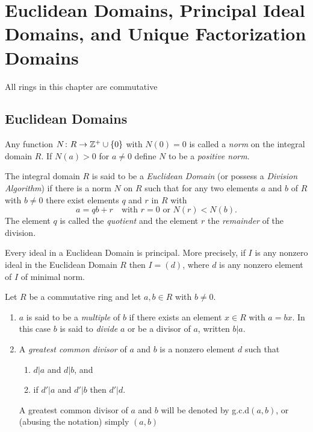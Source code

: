 \documentclass[../main]{subfiles}
\begin{document}
 
\section{Euclidean Domains, Principal Ideal Domains, and Unique Factorization Domains}


All rings in this chapter are commutative

\subsection{Euclidean Domains}


\begin{dfn}
 Any function $N \colon R \to \mathbb{Z}^+ \cup \{0\}$ with $N(0) = 0$ is called a \textit{norm} on the integral domain $R$. If $N(a) > 0$ for $a\neq 0$ define $N$ to be a \textit{positive norm}.
\end{dfn}


\begin{dfn}
 The integral domain $R$ is said to be a \textit{Euclidean Domain} (or possess a \textit{Division Algorithm}) if there is a norm $N$ on $R$ such that for any two elements $a$ and $b$ of $R$ with $b \neq 0$ there exist elements $q$ and $r$ in $R$ with
 \[ a=qb+r \quad \text{with } r=0 \text{ or } N(r) < N(b). \]
 The element $q$ is called the \textit{quotient} and the element $r$ the \textit{remainder} of the division.
\end{dfn}


\begin{prop}
 Every ideal in a Euclidean Domain is principal. More precisely, if $I$ is any nonzero ideal in the Euclidean Domain $R$ then $I = (d)$, where $d$ is any nonzero element of $I$ of minimal norm.
\end{prop}


\begin{dfn}
 Let $R$ be a commutative ring and let $a,b \in R$ with $b \neq 0$.
 \begin{enumerate}
  \item $a$ is said to be a \textit{multiple} of $b$ if there exists an element $x \in R$ with $a=bx$. In this case $b$ is said to \textit{divide} $a$ or be a divisor of $a$, written $b|a$.
  
  \item A \textit{greatest common divisor} of $a$ and $b$ is a nonzero element $d$ such that
  \begin{enumerate}
   \item $d|a$ and $d|b$, and
   
   \item if $d'|a$ and $d'|b$ then $d'|d$.
  \end{enumerate}
  A greatest common divisor of $a$ and $b$ will be denoted by g.c.d$(a,b)$, or (abusing the notation) simply $(a,b)$
 \end{enumerate}
\end{dfn}
\end{document}
